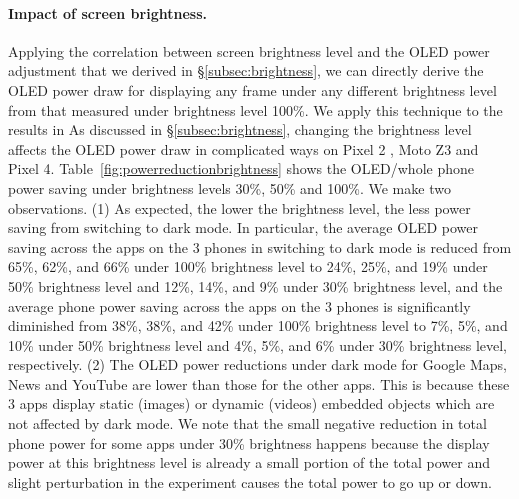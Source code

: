 \paragraph{Impact of screen brightness.}
Applying the correlation between screen brightness level and the OLED
power adjustment that we derived in
\S\ref{subsec:brightness}, we can directly derive the OLED power draw
for displaying any frame under any different brightness level from
that measured under brightness level 100\%.
We apply this technique to the results in
\fi
As discussed in \S\ref{subsec:brightness}, changing the brightness level
  affects the OLED power draw in complicated ways on Pixel 2 , Moto Z3 and Pixel 4.
  Table~\ref{fig:powerreductionbrightness}
  shows the OLED/whole phone power saving under brightness levels 30\%, 50\%
  and 100\%.
We make two observations.
(1) As expected, the lower the brightness level, the less power saving from switching
to  dark mode. In particular, 
the average OLED power saving across the apps on the 3 phones
in switching to dark mode is reduced
from 65\%, 62\%, and 66\% under 100\% brightness level
to 24\%, 25\%, and 19\% under 50\% brightness level
and 12\%, 14\%, and 9\% under 30\% brightness level,
and the average phone power saving across the apps on the 3 phones
is significantly diminished
from 38\%, 38\%, and 42\% under 100\% brightness level
to 7\%, 5\%, and 10\% under 50\% brightness level
and 4\%, 5\%, and 6\% under 30\% brightness level, respectively.
(2) The OLED power reductions under dark mode for Google Maps, News and YouTube 
are lower than those for the other apps. This is because these 3 apps
display static (images) or dynamic (videos) embedded objects %
which are not affected by dark mode.
We note that the small negative reduction in total phone power for some apps under 30\% brightness
happens because the display power at this brightness level is already a small portion
of the total power and slight perturbation in the experiment causes the total power to go up or down.


